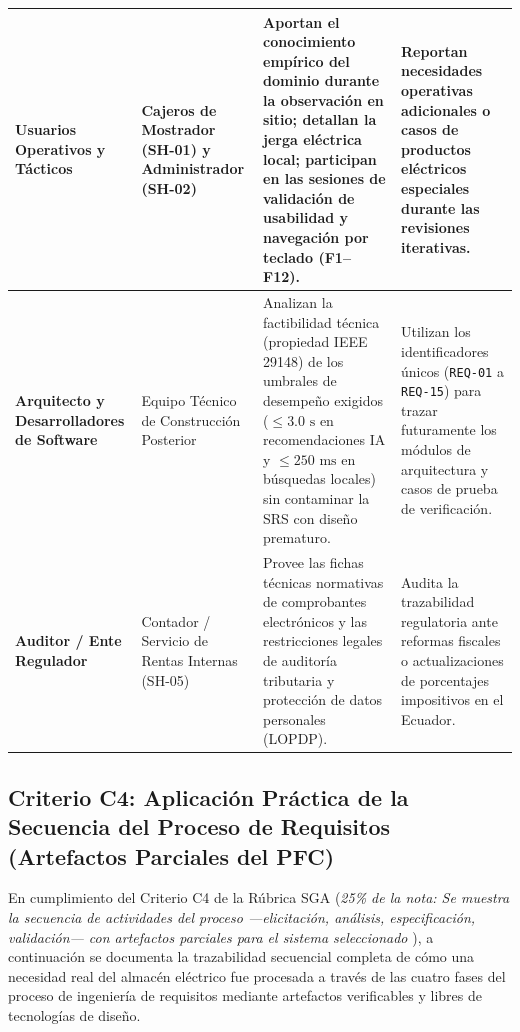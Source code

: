 \begin{table}[htbp]
\begin{tabularx}{\textwidth}{>{\raggedright\arraybackslash}p{} >{\raggedright\arraybackslash}p{} Y Y}
		\midrule
		\textbf{Usuarios Operativos y Tácticos} & Cajeros de Mostrador (SH-01) y Administrador (SH-02) & Aportan el conocimiento empírico del dominio durante la observación en sitio; detallan la jerga eléctrica local; participan en las sesiones de validación de usabilidad y navegación por teclado (F1--F12). & Reportan necesidades operativas adicionales o casos de productos eléctricos especiales durante las revisiones iterativas. \\
		\midrule
		\textbf{Arquitecto y Desarrolladores de Software} & Equipo Técnico de Construcción Posterior & Analizan la factibilidad técnica (propiedad IEEE 29148) de los umbrales de desempeño exigidos ($\le 3.0\text{ s}$ en recomendaciones IA y $\le 250\text{ ms}$ en búsquedas locales) sin contaminar la SRS con diseño prematuro. & Utilizan los identificadores únicos (\texttt{REQ-01} a \texttt{REQ-15}) para trazar futuramente los módulos de arquitectura y casos de prueba de verificación. \\
		\midrule
		\textbf{Auditor / Ente Regulador} & Contador / Servicio de Rentas Internas (SH-05) & Provee las fichas técnicas normativas de comprobantes electrónicos y las restricciones legales de auditoría tributaria y protección de datos personales (LOPDP). & Audita la trazabilidad regulatoria ante reformas fiscales o actualizaciones de porcentajes impositivos en el Ecuador. \\
		\bottomrule
	\end{tabularx}
\end{table}
\subsection{Criterio C4: Aplicación Práctica de la Secuencia del Proceso de Requisitos (Artefactos Parciales del PFC)}
En cumplimiento del Criterio C4 de la Rúbrica SGA (\textit{25\% de la nota: Se muestra la secuencia de actividades del proceso —elicitación, análisis, especificación, validación— con artefactos parciales para el sistema seleccionado} \cite{ieee29148, pohl2025}), a continuación se documenta la trazabilidad secuencial completa de cómo una necesidad real del almacén eléctrico fue procesada a través de las cuatro fases del proceso de ingeniería de requisitos mediante artefactos verificables y libres de tecnologías de diseño.
